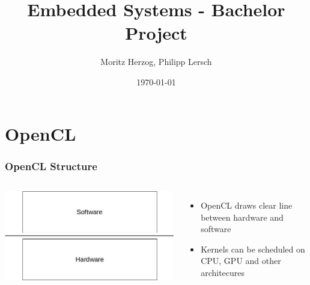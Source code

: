 \documentclass{beamer}
\title{Embedded Systems - Bachelor Project}
\author{Moritz Herzog, Philipp Lersch}
\date{\today}
\begin{document}
\maketitle


\section{OpenCL}
\begin{frame}
    \frametitle{OpenCL Structure}
    \begin{columns}
        \includegraphics[width=\textwidth]{res/HardwareSoftwareLayer.jpg}
        \begin{itemize}
            \item OpenCL draws clear line between hardware and software
            \item Kernels can be scheduled on CPU, GPU and other architecures
        \end{itemize}
    \end{columns}
\end{frame}
\end{document}
